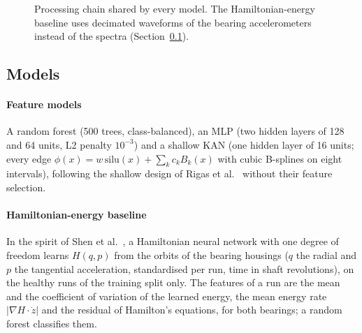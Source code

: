 \documentclass[preprint,review,12pt,authoryear=false]{elsarticle}
\begin{document}
\begin{figure}[t]
\centering
{}
\caption{Processing chain shared by every model. The Hamiltonian-energy baseline uses decimated waveforms of the
bearing accelerometers instead of the spectra (Section~\ref{sec:models}).}
\label{fig:pipeline}
\end{figure}

\subsection{Models}
\label{sec:models}

\paragraph{Feature models} A random forest \citep{breiman2001rf} (500 trees, class-balanced), an MLP (two hidden
layers of 128 and 64 units, L2 penalty $10^{-3}$) and a shallow KAN \citep{liu2024kan} (one hidden layer of 16
units; every edge $\phi(x)=w\,\mathrm{silu}(x)+\sum_k c_k B_k(x)$ with cubic B-splines on eight intervals),
following the shallow design of Rigas et al.~\citep{rigas2024kan} without their feature selection.

\paragraph{Hamiltonian-energy baseline} In the spirit of Shen et al.~\citep{shen2023hnn}, a Hamiltonian neural network
\citep{greydanus2019hnn} with one degree of freedom learns $H(q,p)$ from the orbits of the bearing housings
($q$ the radial and $p$ the tangential acceleration, standardised per run, time in shaft revolutions), on the healthy
runs of the training split only. The features of a run are the mean and the coefficient of variation of the learned
energy, the mean energy rate $|\nabla H\cdot\dot z|$ and the residual of Hamilton's equations, for both bearings; a
random forest classifies them.
\end{document}
